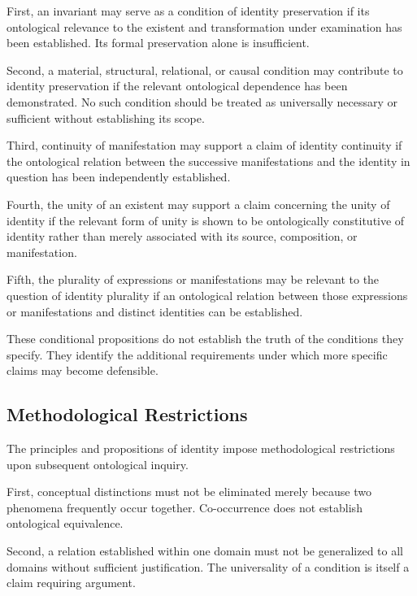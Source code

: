 First, an invariant may serve as a condition of identity
preservation if its ontological relevance to the existent
and transformation under examination has been established.
Its formal preservation alone is insufficient.

Second, a material, structural, relational, or causal
condition may contribute to identity preservation if
the relevant ontological dependence has been demonstrated.
No such condition should be treated as universally
necessary or sufficient without establishing its scope.

Third, continuity of manifestation may support a claim
of identity continuity if the ontological relation between
the successive manifestations and the identity in
question has been independently established.

Fourth, the unity of an existent may support a claim
concerning the unity of identity if the relevant form
of unity is shown to be ontologically constitutive of
identity rather than merely associated with its source,
composition, or manifestation.

Fifth, the plurality of expressions or manifestations
may be relevant to the question of identity plurality
if an ontological relation between those expressions
or manifestations and distinct identities can be
established.

These conditional propositions do not establish the
truth of the conditions they specify. They identify
the additional requirements under which more specific
claims may become defensible.


\subsection{Methodological Restrictions}

The principles and propositions of identity impose
methodological restrictions upon subsequent ontological
inquiry.

First, conceptual distinctions must not be eliminated
merely because two phenomena frequently occur together.
Co-occurrence does not establish ontological equivalence.

Second, a relation established within one domain must
not be generalized to all domains without sufficient
justification. The universality of a condition is itself
a claim requiring argument.

